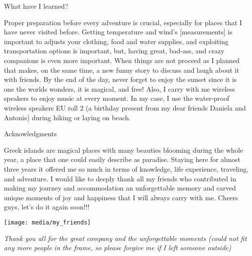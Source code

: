 \documentclass[10pt,a4paper]{article} %
\newcommand{\NewsItem}[1]{ %
\usefont{T1}{fvs}{n}{n} %
\vspace{24pt}\large #1\vspace{3pt} %
\par \normalsize \normalfont}
\begin{document}
\begin{multicols}{3}
\NewsItem{What have I learned?}
Proper preparation before every adventure is crucial, especially for places that I 
have never visited before. 
Getting temperature and wind's [measurements] is important to adjusts your clothing, 
food and water supplies, and exploiting transportation options is important, but, 
having great, bad-ass, and crazy companions is even more important. 
When things are not proceed as I planned that makes, on the same time, a new funny 
story to discuss and laugh about it with friends.     
By the end of the day, never forget to enjoy the sunset since it is one the worlds 
wonders, it is magical, and free! 
Also, I carry with me wireless speakers to enjoy music at every moment. 
In my case, I use the water-proof wireless speakers EU roll 2 (a birthday present 
from my dear friends Daniela and Antonis) during hiking or laying on beach. 

\NewsItem{Acknowledgments}
Greek islands are magical places with many beauties blooming during the whole year, 
a place that one could easily describe as paradise. 
Staying here for almost three years it offered me so much in terms of knowledge, 
life experience, traveling, and adventure. 
I would like to deeply thank all my friends who contributed in making my journey 
and accommodation an unforgettable memory and carved unique moments of joy 
and happiness that I will always carry with me. 
Cheers guys, let's do it again soon!!!

\end{multicols}

\begin{center}
	\texttt{[image: media/my\_friends]}
	\par\textit{Thank you all for the great company and the unforgettable moments (could not fit any more people in the frame, so please forgive me if I left someone outside)}
\end{center}
\end{document}
